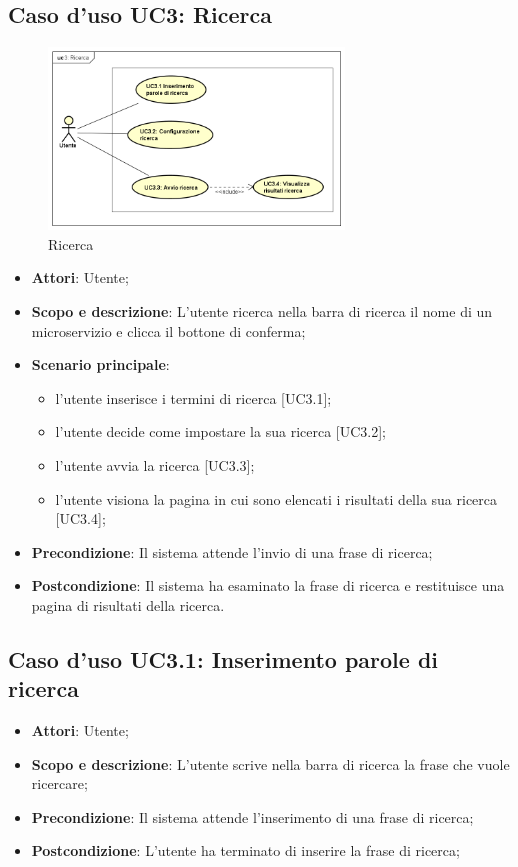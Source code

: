\documentclass[12pt,a4paper,titlepage]{article}
\begin{document}
	\subsection{Caso d'uso UC3: Ricerca}
	\label{UC3}
	\begin{figure}[H]
		\centering
		\includegraphics[width=0.7\textwidth]{UseCase/Ricerca}
		\caption{Ricerca}
	\end{figure}
	\begin{itemize}
		\item \textbf{Attori}: Utente;
		\item \textbf{Scopo e descrizione}: L'utente ricerca nella barra di ricerca il nome di un microservizio e clicca il bottone di conferma;
		\item \textbf{Scenario principale}:
		\begin{itemize}
			\item l'utente inserisce i termini di ricerca [UC3.1];
			\item l'utente decide come impostare la sua ricerca [UC3.2];
			\item l'utente avvia la ricerca [UC3.3];
			\item l'utente visiona la pagina in cui sono elencati i risultati della sua ricerca [UC3.4];
		\end{itemize}
		\item \textbf{Precondizione}: Il sistema attende l'invio di una frase di ricerca;
		\item \textbf{Postcondizione}: Il sistema ha esaminato la frase di ricerca e restituisce una pagina di risultati della ricerca.
	\end{itemize}
	\subsection{Caso d'uso UC3.1: Inserimento parole di ricerca}
	\label{UC3.1}
	\begin{itemize}
		\item \textbf{Attori}: Utente;
		\item \textbf{Scopo e descrizione}: L'utente scrive nella barra di ricerca la frase che vuole ricercare;
		\item \textbf{Precondizione}: Il sistema attende l'inserimento di una frase di ricerca;
		\item \textbf{Postcondizione}: L'utente ha terminato di inserire la frase di ricerca;
	\end{itemize}
\end{document}
